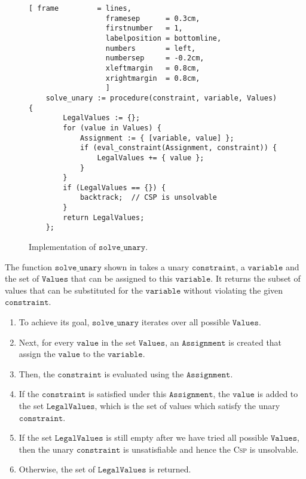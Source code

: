 \begin{figure}[!ht]
\centering
\begin{Verbatim}[ frame         = lines, 
                  framesep      = 0.3cm, 
                  firstnumber   = 1,
                  labelposition = bottomline,
                  numbers       = left,
                  numbersep     = -0.2cm,
                  xleftmargin   = 0.8cm,
                  xrightmargin  = 0.8cm,
                  ]
    solve_unary := procedure(constraint, variable, Values) {
        LegalValues := {};
        for (value in Values) {
            Assignment := { [variable, value] };
            if (eval_constraint(Assignment, constraint)) {
                LegalValues += { value };
            }
        }
        if (LegalValues == {}) {
            backtrack;  // CSP is unsolvable
        }
        return LegalValues;
    };
\end{Verbatim}
\vspace*{-0.3cm}
\caption{Implementation of $\texttt{solve\_unary}$.}
\label{fig:csp-constraint-propagation.stlx:solve_unary}
\end{figure}

The function $\texttt{solve\_unary}$ shown in  takes a unary
$\texttt{constraint}$, a $\texttt{variable}$ and the set of $\texttt{Values}$ that can be assigned to this
$\texttt{variable}$.  It returns the subset of values that can be substituted for the $\texttt{variable}$
without violating the given $\texttt{constraint}$.
\begin{enumerate}
\item To achieve its goal, $\texttt{solve\_unary}$ iterates over all possible $\texttt{Values}$.  
\item Next, for every $\texttt{value}$ in the set $\texttt{Values}$, an $\texttt{Assignment}$ is created that assign
      the $\texttt{value}$ to the $\texttt{variable}$.
\item Then, the $\texttt{constraint}$ is evaluated using the $\texttt{Assignment}$.
\item If the $\texttt{constraint}$ is satisfied under this $\texttt{Assignment}$, the $\texttt{value}$ is added to the set
      $\texttt{LegalValues}$, which is the set of values which satisfy the unary $\texttt{constraint}$.
\item If the set $\texttt{LegalValues}$ is still empty after we have tried all possible $\texttt{Values}$, then
      the unary $\texttt{constraint}$ is unsatisfiable and hence the \textsc{Csp} is unsolvable.
\item Otherwise, the set of $\texttt{LegalValues}$ is returned.
\end{enumerate}

